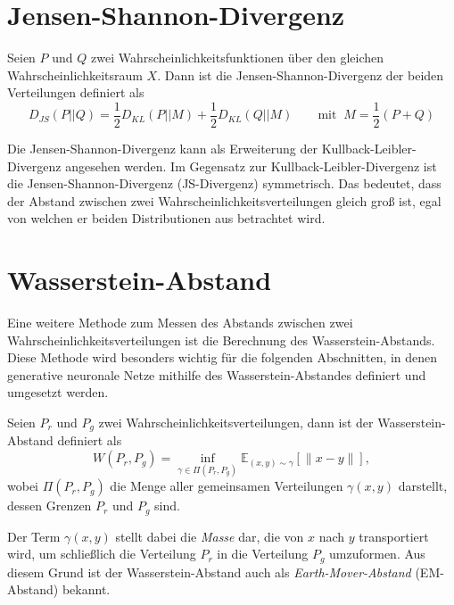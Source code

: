\section{Jensen-Shannon-Divergenz}
\begin{definition}
Seien $P$ und $Q$ zwei Wahr\-schein\-lichkeitsfunktionen über den gleichen
Wahrscheinlichkeitsraum $X$. Dann ist die Jensen-Shannon-Divergenz der
beiden Verteilungen definiert als
\[
    D_{JS}(P \lvert\lvert Q) = \frac{1}{2} D_{KL}(P \lvert\lvert M) + \frac{1}{2} D_{KL}(Q \lvert\lvert M) \quad\quad \text{mit} \;\; M = \frac{1}{2}(P + Q)
\]
\end{definition}
Die Jensen-Shannon-Divergenz kann als Erweiterung der
Kullback-Leibler-Divergenz angesehen werden. Im Gegensatz zur
Kullback-Leibler-Divergenz ist die Jensen-Shannon-Divergenz (JS-Divergenz)
symmetrisch. Das bedeutet, dass der Abstand zwischen zwei
Wahrscheinlichkeitsverteilungen gleich groß ist, egal von welchen er beiden
Distributionen aus betrachtet wird.

\section{Wasserstein-Abstand}
Eine weitere Methode zum Messen des Abstands zwischen zwei
Wahrscheinlichkeitsverteilungen ist die Berechnung des Wasserstein-Abstands.
Diese Methode wird besonders wichtig für die folgenden Abschnitten, in denen
generative neuronale Netze mithilfe des Wasserstein-Abstandes definiert und
umgesetzt werden.

\begin{definition}
Seien $P_r$ und $P_g$ zwei Wahrscheinlichkeitsverteilungen, dann ist der
Wasserstein-Abstand definiert als
\[
    W(P_r, P_g) = \inf_{\gamma \in \Pi(P_r, P_g)} \mathbb{E}_{(x, y) \sim \gamma} \left[\|x - y\|\right],
\]
wobei $\Pi(P_r, P_g)$ die Menge aller gemeinsamen Verteilungen $\gamma(x,
y)$ darstellt, dessen Grenzen $P_r$ und $P_g$ sind.
\end{definition}

Der Term $\gamma(x, y)$ stellt dabei die \textit{Masse} dar, die von $x$ nach
$y$ transportiert wird, um schließlich die Verteilung $P_r$ in die Verteilung
$P_g$ umzuformen. Aus diesem Grund ist der Wasserstein-Abstand auch als
\textit{Earth-Mover-Abstand} (EM-Abstand) bekannt.

